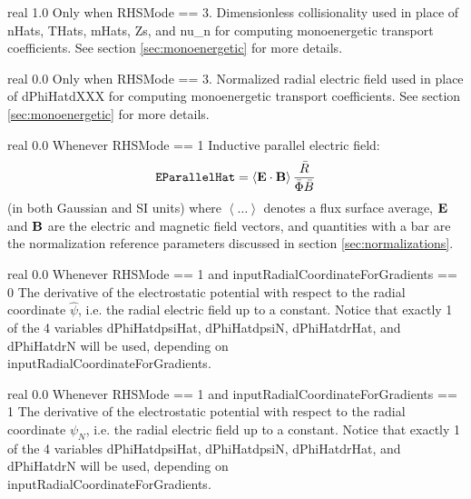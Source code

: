 \myhrule

{real}
{1.0}
{Only when {\ttfamily RHSMode} == 3.}
{Dimensionless collisionality used in place of {\ttfamily nHats}, {\ttfamily THats}, {\ttfamily mHats}, {\ttfamily Zs}, and {\ttfamily nu\_n} for computing monoenergetic transport coefficients.
See section \ref{sec:monoenergetic} for more details.}

\myhrule

{real}
{0.0}
{Only when {\ttfamily RHSMode} == 3.}
{Normalized radial electric field used in place of {\ttfamily dPhiHatdXXX} for computing monoenergetic transport coefficients.
See section \ref{sec:monoenergetic} for more details.}

\myhrule

{real}
{0.0}
{Whenever {\ttfamily RHSMode} == 1}
{Inductive parallel electric field:
\begin{equation}
\mbox{\ttfamily EParallelHat} = \left< {\mathbf E}\cdot{\mathbf B}\right> \frac{\bar{R}}{\bar{\Phi}\bar{B}}
\end{equation}
(in both Gaussian and SI units) where $\left< \ldots \right>$ denotes a flux surface average,
${\mathbf E}$ and ${\mathbf B}$ are the electric and magnetic field vectors, and 
quantities with a bar are the normalization reference parameters discussed in section \ref{sec:normalizations}.}

\myhrule

{real}
{0.0}
{Whenever {\ttfamily RHSMode} == 1 and {\ttfamily inputRadialCoordinateForGradients} == 0}
{The derivative of the electrostatic potential with respect to the radial coordinate $\hat{\psi}$,
i.e. the radial electric field up to a constant.
Notice that exactly 1 of the 4 variables {\ttfamily dPhiHatdpsiHat}, {\ttfamily dPhiHatdpsiN}, {\ttfamily dPhiHatdrHat}, and {\ttfamily dPhiHatdrN}
will be used, depending on\\
{\ttfamily inputRadialCoordinateForGradients}.
}

\myhrule

{real}
{0.0}
{Whenever {\ttfamily RHSMode} == 1 and {\ttfamily inputRadialCoordinateForGradients} == 1}
{The derivative of the electrostatic potential with respect to the radial coordinate $\psi_N$,
i.e. the radial electric field up to a constant.
Notice that exactly 1 of the 4 variables {\ttfamily dPhiHatdpsiHat}, {\ttfamily dPhiHatdpsiN}, {\ttfamily dPhiHatdrHat}, and {\ttfamily dPhiHatdrN}
will be used, depending on\\
{\ttfamily inputRadialCoordinateForGradients}.
}

